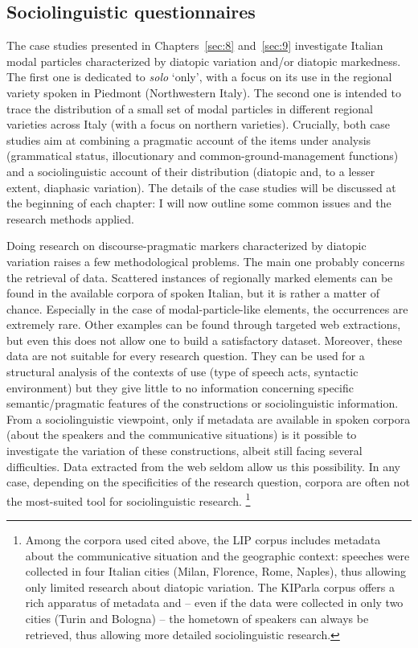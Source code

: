 \subsection{Sociolinguistic questionnaires}
\hypertarget{Toc124860646}{}
The case studies presented in Chapters~\ref{sec:8} and~\ref{sec:9} investigate Italian modal particles characterized by diatopic variation and/or diatopic markedness. The first one is dedicated to \textit{solo} ‘only’, with a focus on its use in the regional variety spoken in Piedmont (Northwestern Italy). The second one is intended to trace the distribution of a small set of modal particles in different regional varieties across Italy (with a focus on northern varieties). Crucially, both case studies aim at combining a pragmatic account of the items under analysis (grammatical status, illocutionary and common-ground-management functions) and a sociolinguistic account of their distribution (diatopic and, to a lesser extent, diaphasic variation). The details of the case studies will be discussed at the beginning of each chapter: I will now outline some common issues and the research methods applied.

Doing research on discourse-pragmatic markers characterized by diatopic variation raises a few methodological problems. The main one probably concerns the retrieval of data. Scattered instances of regionally marked elements can be found in the available corpora of spoken Italian, but it is rather a matter of chance. Especially in the case of modal-particle-like elements, the occurrences are extremely rare. Other examples can be found through targeted web extractions, but even this does not allow one to build a satisfactory dataset. Moreover, these data are not suitable for every research question. They can be used for a structural analysis of the contexts of use (type of speech acts, syntactic environment) but they give little to no information concerning specific semantic/pragmatic features of the constructions or sociolinguistic information. From a sociolinguistic viewpoint, only if metadata are available in spoken corpora (about the speakers and the communicative situations) is it possible to investigate the variation of these constructions, albeit still facing several difficulties. Data extracted from the web seldom allow us this possibility. In any case, depending on the specificities of the research question, corpora are often not the most-suited tool for sociolinguistic research.\textsuperscript{} \footnote{Among the corpora used cited above, the LIP corpus includes metadata about the communicative situation and the geographic context: speeches were collected in four Italian cities (Milan, Florence, Rome, Naples), thus allowing only limited research about diatopic variation. The KIParla corpus offers a rich apparatus of metadata and – even if the data were collected in only two cities (Turin and Bologna) – the hometown of speakers can always be retrieved, thus allowing more detailed sociolinguistic research.}

